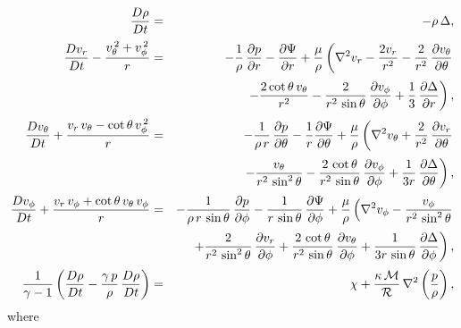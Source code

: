 \begin{eqnarray}
\frac{D\rho}{Dt} &=&-\rho\,\Delta,\\[0.5ex]
\frac{Dv_r}{Dt}-\frac{v_\theta^{\,2}+v_\phi^{\,2}}{r}&=& - \frac{1}{\rho}\,\frac{\partial p}{\partial r} - \frac{\partial\Psi}{\partial r}
+ \frac{\mu}{\rho}\left(\nabla^2 v_r -\frac{2 v_r}{r^2}-\frac{2}{r^2}\,\frac{\partial v_\theta}{\partial\theta}\right.\nonumber\\[0.5ex]&&\left.-\frac{2\cot\theta\,v_\theta}{r^2}-\frac{2}{r^2\,\sin\theta}\,\frac{\partial v_\phi}{\partial\phi}+ \frac{1}{3}\,\frac{\partial\Delta}{\partial r}\right),\\[0.5ex]
\frac{Dv_\theta}{Dt}+\frac{v_r\,v_\theta-\cot\theta\,v_\phi^{\,2}}{r}&=& - \frac{1}{\rho\,r}\,\frac{\partial p}{\partial \theta} - \frac{1}{r}\frac{\partial\Psi}{\partial \theta}
+\frac{\mu}{\rho}\left(\nabla^2 v_\theta +\frac{2}{r^2}\,\frac{\partial v_r}{\partial\theta} \right.\\[0.5ex]
&&\left.-\frac{v_\theta}{r^2\,\sin^2\theta}-\frac{2\,\cot\theta}{r^2\,\sin\theta}\,\frac{\partial v_\phi}{\partial\phi}+ \frac{1}{3r}\,\frac{\partial\Delta}{\partial \theta}\right),\\[0.5ex]
\frac{Dv_\phi}{Dt}+\frac{v_r\,v_\phi + \cot\theta\,v_\theta\,v_\phi}{r}&=& - \frac{1}{\rho\,r\,\sin\theta}\,\frac{\partial p}{\partial \phi} - \frac{1}{r\,\sin\theta}\,\frac{\partial\Psi}{\partial \phi}
+ \frac{\mu}{\rho}\left(\nabla^2 v_\phi-\frac{v_\phi}{r^2\,\sin^2\theta} \right.\nonumber\\[0.5ex]
&&\left. + \frac{2}{r^2\,\sin^2\theta}\,\frac{\partial v_r}{\partial \phi}+ \frac{2\,\cot\theta}{r^2\,\sin\theta}\,\frac{\partial v_\theta}{\partial\phi}+ \frac{1}{3r\,\sin\theta}\,\frac{\partial\Delta}{\partial \phi}\right),\\[0.5ex]
\frac{1}{\gamma-1}\left(\frac{D\rho}{Dt} - \frac{\gamma\,p}{\rho}\,\frac{D\rho}{Dt}\right)
&=&\chi + \frac{\kappa\,{\cal M}}{\cal R}\,\nabla^2\left(\frac{p}{\rho}\right),
\end{eqnarray}
where 
